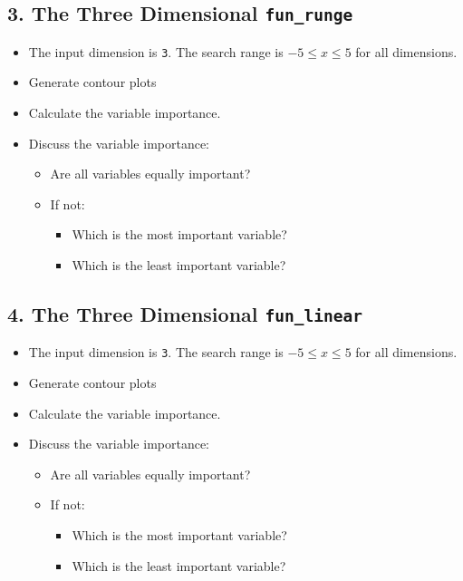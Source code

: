 \documentclass[
  letterpaper,
  DIV=11,
  numbers=noendperiod]{scrreprt}
\providecommand{\tightlist}{%
  \setlength{\itemsep}{0pt}\setlength{\parskip}{0pt}}\usepackage{longtable,booktabs,array}
\begin{document}
\subsection{\texorpdfstring{3. The Three Dimensional
\texttt{fun\_runge}}{3. The Three Dimensional fun\_runge}}\label{the-three-dimensional-fun_runge}

\begin{itemize}
\tightlist
\item
  The input dimension is \texttt{3}. The search range is
  \(-5 \leq x \leq 5\) for all dimensions.
\item
  Generate contour plots
\item
  Calculate the variable importance.
\item
  Discuss the variable importance:

  \begin{itemize}
  \tightlist
  \item
    Are all variables equally important?
  \item
    If not:

    \begin{itemize}
    \tightlist
    \item
      Which is the most important variable?
    \item
      Which is the least important variable?
    \end{itemize}
  \end{itemize}
\end{itemize}

\subsection{\texorpdfstring{4. The Three Dimensional
\texttt{fun\_linear}}{4. The Three Dimensional fun\_linear}}\label{the-three-dimensional-fun_linear}

\begin{itemize}
\tightlist
\item
  The input dimension is \texttt{3}. The search range is
  \(-5 \leq x \leq 5\) for all dimensions.
\item
  Generate contour plots
\item
  Calculate the variable importance.
\item
  Discuss the variable importance:

  \begin{itemize}
  \tightlist
  \item
    Are all variables equally important?
  \item
    If not:

    \begin{itemize}
    \tightlist
    \item
      Which is the most important variable?
    \item
      Which is the least important variable?
    \end{itemize}
  \end{itemize}
\end{itemize}
\end{document}
